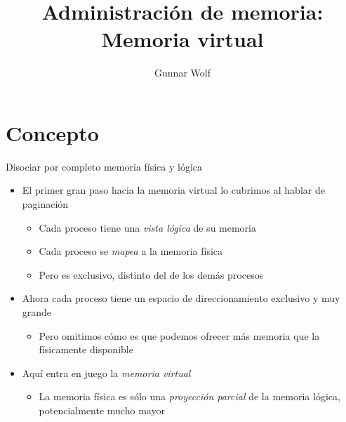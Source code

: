 \documentclass[presentation]{beamer}
\author{Gunnar Wolf}
\date{}
\title{Administración de memoria: Memoria virtual}
\begin{document}
\maketitle

\section{Concepto}
\label{sec:org9728bc5}

\begin{frame}[label={sec:org48a01a6}]{Disociar por completo memoria física y lógica}
\begin{itemize}
\item El primer gran paso hacia la memoria virtual lo cubrimos al hablar
de paginación
\begin{itemize}
\item Cada proceso tiene una \emph{vista lógica} de su memoria
\item Cada proceso se \emph{mapea} a la memoria física
\item Pero es exclusivo, distinto del de los demás procesos
\end{itemize}
\item Ahora cada proceso tiene un espacio de direccionamiento exclusivo y
muy grande
\begin{itemize}
\item Pero omitimos cómo es que podemos ofrecer más memoria que la
físicamente disponible
\end{itemize}
\item Aquí entra en juego la \emph{memoria virtual}
\begin{itemize}
\item La memoria física es sólo una \emph{proyección parcial} de la memoria
lógica, potencialmente mucho mayor
\end{itemize}
\end{itemize}
\end{frame}
\end{document}
